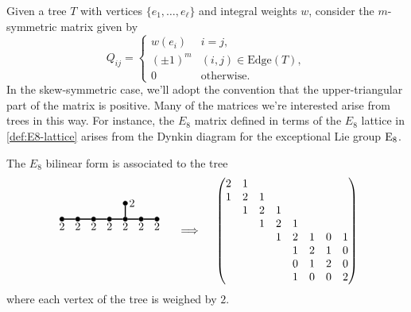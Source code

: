Given a tree $T$ with vertices $\{e_1,\ldots, e_\ell\}$ and integral weights $w$, consider the $m$-symmetric matrix given by
\[
	Q_{ij} = \begin{cases}
		w(e_i)    & i=j,                       \\
		(\pm 1)^m & (i,j)\in \textrm{Edge}(T), \\
		0         & \textrm{otherwise}.
	\end{cases}
\]
In the skew-symmetric case, we'll adopt the convention that the upper-triangular part of the matrix is positive. Many of the matrices we're interested arise from trees in this way. For instance, the $E_8$ matrix defined in terms of the $E_8$ lattice in \cref{def:E8-lattice} arises from the Dynkin diagram for the exceptional Lie group ${\operatorname{E}}_8$.
\begin{proposition}
	The ${E_8}$ bilinear form is associated to the tree
	\[
		\begin{tikzpicture}
			\tikzset{dynode/.style={circle, draw, fill=black,
						minimum size=4pt, inner sep=0pt}}
			\tikzset{dyline/.style={line width=1pt}}
			\tikzset{dydash/.style={line width=1pt, dashed}}

			\begin{scope}[yshift=-10em, xshift=0]
				\node[dynode] (a1) at (0,0) {};
				\node[dynode] (a2) at (0.5,0) {};
				\node[dynode] (a3) at (1,0) {};
				\node[dynode] (a4) at (1.5,0) {};
				\node[dynode] (a5) at (2,0) {};
				\node[dynode] (a6) at (2.5,0) {};
				\node[dynode] (a7) at (3,0) {};
				\node[dynode] (a8) at (2,0.5) {};

				\draw[dyline] (a1) -- (a2) -- (a3) -- (a4) -- (a5) -- (a6) -- (a7);
				\draw[dyline] (a5) -- (a8);

				\node[below] () at (a1) {$2$};
				\node[below] () at (a2) {$2$};
				\node[below] () at (a3) {$2$};
				\node[below] () at (a4) {$2$};
				\node[below] () at (a5) {$2$};
				\node[below] () at (a6) {$2$};
				\node[below] () at (a7) {$2$};
				\node[right] () at (a8) {$2$};
			\end{scope}
		\end{tikzpicture}
		\quad\implies\quad
		\begin{pmatrix}
			2 & 1 &   &   &   &   &   &   \\
			1 & 2 & 1 &   &   &   &   &   \\
			  & 1 & 2 & 1 &   &   &   &   \\
			  &   & 1 & 2 & 1 &   &   &   \\
			  &   &   & 1 & 2 & 1 & 0 & 1 \\
			  &   &   &   & 1 & 2 & 1 & 0 \\
			  &   &   &   & 0 & 1 & 2 & 0 \\
			  &   &   &   & 1 & 0 & 0 & 2 \\
		\end{pmatrix}
	\]
	where each vertex of the tree is weighed by $2$.
\end{proposition}

